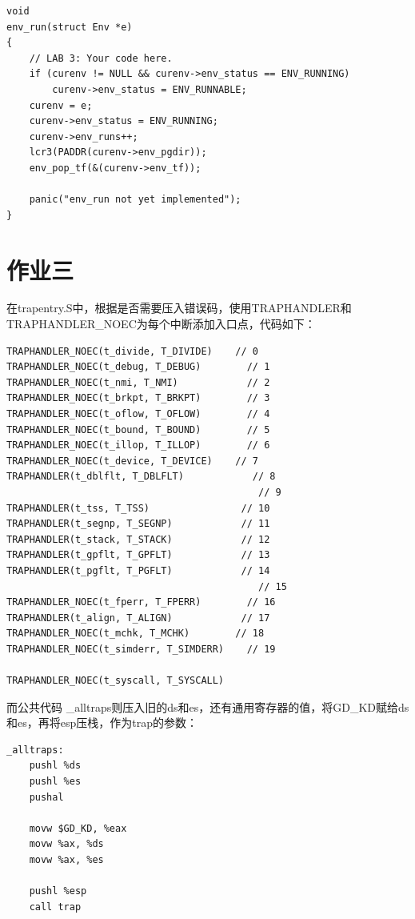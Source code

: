 \documentclass[12pt,a4paper,UTF8]{article}
\begin{document}
    \begin{lstlisting}[style=CPP]
void
env_run(struct Env *e)
{
    // LAB 3: Your code here.
    if (curenv != NULL && curenv->env_status == ENV_RUNNING)
        curenv->env_status = ENV_RUNNABLE;
    curenv = e;
    curenv->env_status = ENV_RUNNING;
    curenv->env_runs++;
    lcr3(PADDR(curenv->env_pgdir));
    env_pop_tf(&(curenv->env_tf));
    
    panic("env_run not yet implemented");
}
    \end{lstlisting}

\section{作业三}

    在trapentry.S中，根据是否需要压入错误码，使用TRAPHANDLER和TRAPHANDLER\_NOEC为每个中断添加入口点，代码如下：

    \begin{lstlisting}[style=CPP]
TRAPHANDLER_NOEC(t_divide, T_DIVIDE)    // 0
TRAPHANDLER_NOEC(t_debug, T_DEBUG)        // 1
TRAPHANDLER_NOEC(t_nmi, T_NMI)            // 2
TRAPHANDLER_NOEC(t_brkpt, T_BRKPT)        // 3
TRAPHANDLER_NOEC(t_oflow, T_OFLOW)        // 4
TRAPHANDLER_NOEC(t_bound, T_BOUND)        // 5
TRAPHANDLER_NOEC(t_illop, T_ILLOP)        // 6
TRAPHANDLER_NOEC(t_device, T_DEVICE)    // 7
TRAPHANDLER(t_dblflt, T_DBLFLT)            // 8
                                            // 9
TRAPHANDLER(t_tss, T_TSS)                // 10
TRAPHANDLER(t_segnp, T_SEGNP)            // 11
TRAPHANDLER(t_stack, T_STACK)            // 12
TRAPHANDLER(t_gpflt, T_GPFLT)            // 13
TRAPHANDLER(t_pgflt, T_PGFLT)            // 14
                                            // 15
TRAPHANDLER_NOEC(t_fperr, T_FPERR)        // 16
TRAPHANDLER(t_align, T_ALIGN)            // 17
TRAPHANDLER_NOEC(t_mchk, T_MCHK)        // 18
TRAPHANDLER_NOEC(t_simderr, T_SIMDERR)    // 19
    
TRAPHANDLER_NOEC(t_syscall, T_SYSCALL)
    \end{lstlisting}

    而公共代码 \_alltraps则压入旧的ds和es，还有通用寄存器的值，将GD\_KD赋给ds和es，再将esp压栈，作为trap的参数：
    \begin{lstlisting}[style=CPP]
_alltraps:
    pushl %ds
    pushl %es
    pushal

    movw $GD_KD, %eax
    movw %ax, %ds
    movw %ax, %es

    pushl %esp
    call trap
    \end{lstlisting}
\end{document}
